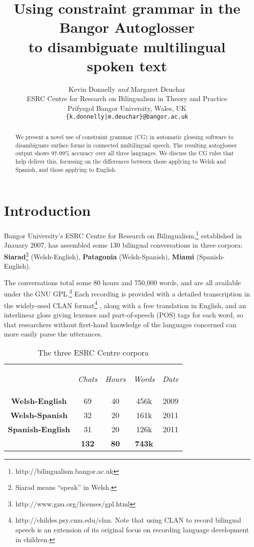 \documentclass[11pt]{article}
\title{Using constraint grammar in the Bangor Autoglosser\\ to disambiguate multilingual spoken text}
\author{Kevin Donnelly \textit{and} Margaret Deuchar\\
  ESRC Centre for Research on Bilingualism in Theory and Practice\\
  Prifysgol Bangor University, Wales, UK\\
  {\tt \{k.donnelly|m.deuchar\}@bangor.ac.uk}  }
\date{}
\begin{document}
\maketitle
\begin{abstract}
We present a novel use of constraint grammar (CG) in automatic glossing software to disambiguate surface forms in connected multilingual speech.  The resulting autoglosser output shows 97-99\% accuracy over all three languages.  We discuss the CG rules that help deliver this, focussing on the differences between those applying to Welsh and Spanish, and those applying to English.
\end{abstract}

\smallskip
\section{Introduction}
\label{sec:intro}

Bangor University's ESRC Centre for Research on Bilingualism,\footnote{http://bilingualism.bangor.ac.uk} established in Jnauary 2007, has assembled some 130 bilingual conversations in three corpora: \textbf{Siarad}\footnote{Siarad means ``speak'' in Welsh.} (Welsh-English), \textbf{Patagonia} (Welsh-Spanish), \textbf{Miami} (Spanish-English).

The conversations total some 80 hours and 750,000 words, and are all available under the GNU GPL.\footnote{http://www.gnu.org/licenses/gpl.html}  Each recording is provided with a detailed transcription in the widely-used CLAN format\footnote{http://childes.psy.cmu.edu/clan.  Note that using CLAN to record bilingual speech is an extension of its original focus on recording language development in children.} \cite{macwhinney2000}, along with a free translation in English, and an interlinear gloss giving lexemes and part-of-speech (POS) tags for each word, so that researchers without first-hand knowledge of the languages concerned can more easily parse the utterances.

\begin{table}[!hbtp]
\centering
\begin{tabular}{ccccc}
& \begin{small}\textit{Chats}\end{small} & \begin{small}\textit{Hours}\end{small} & \begin{small}\textit{Words}\end{small} & \begin{small}\textit{Date}\end{small} \\
\cline{1-5}\noalign{\smallskip}
\textbf{Welsh-English} & 69 & 40 & 456k & 2009 \\
\textbf{Welsh-Spanish} & 32 & 20 & 161k & 2011 \\
\textbf{Spanish-English} & 31 & 20 & 126k & 2011 \\
\hline\noalign{\smallskip}
& \textbf{132} & \textbf{80} & \textbf{743k} \\
\end{tabular}
\caption{The three ESRC Centre corpora}
\label{corpora}
\end{table}
\end{document}
